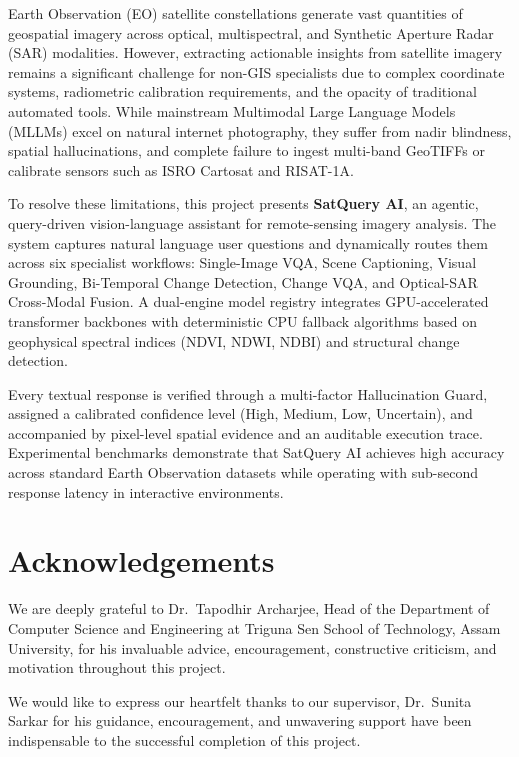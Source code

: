 \documentclass[12pt,a4paper]{report}
\begin{document}
Earth Observation (EO) satellite constellations generate vast quantities of geospatial imagery across optical, multispectral, and Synthetic Aperture Radar (SAR) modalities. However, extracting actionable insights from satellite imagery remains a significant challenge for non-GIS specialists due to complex coordinate systems, radiometric calibration requirements, and the opacity of traditional automated tools. While mainstream Multimodal Large Language Models (MLLMs) excel on natural internet photography, they suffer from nadir blindness, spatial hallucinations, and complete failure to ingest multi-band GeoTIFFs or calibrate sensors such as ISRO Cartosat and RISAT-1A.

To resolve these limitations, this project presents \textbf{SatQuery AI}, an agentic, query-driven vision-language assistant for remote-sensing imagery analysis. The system captures natural language user questions and dynamically routes them across six specialist workflows: Single-Image VQA, Scene Captioning, Visual Grounding, Bi-Temporal Change Detection, Change VQA, and Optical-SAR Cross-Modal Fusion. A dual-engine model registry integrates GPU-accelerated transformer backbones with deterministic CPU fallback algorithms based on geophysical spectral indices (NDVI, NDWI, NDBI) and structural change detection.

Every textual response is verified through a multi-factor Hallucination Guard, assigned a calibrated confidence level (High, Medium, Low, Uncertain), and accompanied by pixel-level spatial evidence and an auditable execution trace. Experimental benchmarks demonstrate that SatQuery AI achieves high accuracy across standard Earth Observation datasets while operating with sub-second response latency in interactive environments.
\clearpage

\clearpage
\chapter*{Acknowledgements}

We are deeply grateful to Dr.\ Tapodhir Archarjee, Head of the Department of Computer Science and Engineering at Triguna Sen School of Technology, Assam University, for his invaluable advice, encouragement, constructive criticism, and motivation throughout this project.

We would like to express our heartfelt thanks to our supervisor, Dr.\ Sunita Sarkar for his guidance, encouragement, and unwavering support have been indispensable to the successful completion of this project.
\end{document}
